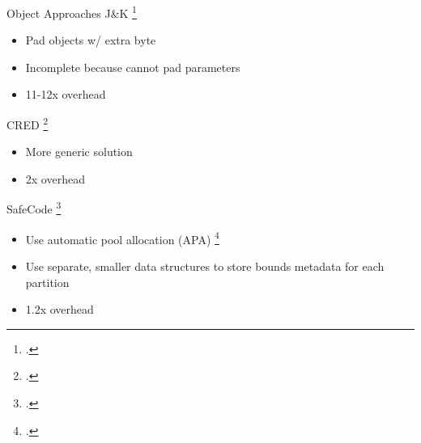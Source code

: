 \documentclass[aspectratio=169]{beamer}
\begin{document}



\begin{frame}{Object Approaches}
J\&K \footcite{jones_backwards_1997}
    \begin{itemize}
       \item Pad objects w/ extra byte
       \item Incomplete because cannot pad parameters 
       \item 11-12x overhead
    \end{itemize}
\vspace{0.2in}

CRED \footcite{ruwase_practical_2004}
    \begin{itemize}
      \item More generic solution 
      \item 2x overhead
    \end{itemize}
\vspace{0.2in}

SafeCode \footcite{dhurjati_2006_backwards}
    \begin{itemize}
        \item Use automatic pool allocation (APA) \footcite{lattner_automatic_2005} 
        \item Use separate, \alert{smaller} data structures to store bounds metadata for \alert{each partition}
        \item 1.2x overhead
    \end{itemize}
\vspace{0.2in}


\end{frame}
\end{document}
